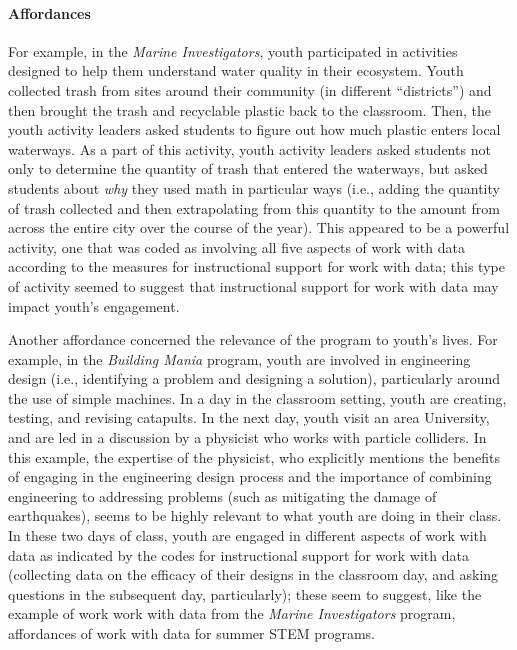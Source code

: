 \documentclass[]{book}
\let\oldparagraph\paragraph
\renewcommand{\paragraph}[1]{\oldparagraph{#1}\mbox{}}
\theoremstyle{definition}
\theoremstyle{definition}
\theoremstyle{definition}
\theoremstyle{remark}
\begin{document}
\paragraph{Affordances}\label{affordances}

For example, in the \emph{Marine Investigators}, youth participated in
activities designed to help them understand water quality in their
ecosystem. Youth collected trash from sites around their community (in
different ``districts'') and then brought the trash and recyclable
plastic back to the classroom. Then, the youth activity leaders asked
students to figure out how much plastic enters local waterways. As a
part of this activity, youth activity leaders asked students not only to
determine the quantity of trash that entered the waterways, but asked
students about \emph{why} they used math in particular ways (i.e.,
adding the quantity of trash collected and then extrapolating from this
quantity to the amount from across the entire city over the course of
the year). This appeared to be a powerful activity, one that was coded
as involving all five aspects of work with data according to the
measures for instructional support for work with data; this type of
activity seemed to suggest that instructional support for work with data
may impact youth's engagement.

Another affordance concerned the relevance of the program to youth's
lives. For example, in the \emph{Building Mania} program, youth are
involved in engineering design (i.e., identifying a problem and
designing a solution), particularly around the use of simple machines.
In a day in the classroom setting, youth are creating, testing, and
revising catapults. In the next day, youth visit an area University, and
are led in a discussion by a physicist who works with particle
colliders. In this example, the expertise of the physicist, who
explicitly mentions the benefits of engaging in the engineering design
process and the importance of combining engineering to addressing
problems (such as mitigating the damage of earthquakes), seems to be
highly relevant to what youth are doing in their class. In these two
days of class, youth are engaged in different aspects of work with data
as indicated by the codes for instructional support for work with data
(collecting data on the efficacy of their designs in the classroom day,
and asking questions in the subsequent day, particularly); these seem to
suggest, like the example of work work with data from the \emph{Marine
Investigators} program, affordances of work with data for summer STEM
programs.
\end{document}
